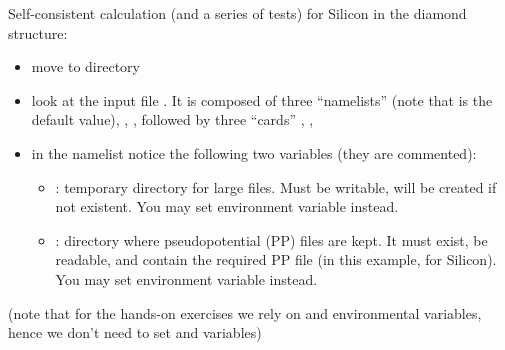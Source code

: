 \documentclass[landscape]{foils}
\begin{document}
%
Self-consistent calculation (and a series of tests) for Silicon in the
diamond structure:
\begin{itemize}
\item move to  directory
\item look at the input file . It is composed of three
``namelists''  (note that 
is the default value), , , followed 
by three ``cards'' , ,
\item in the  namelist notice the following two
  variables (they are commented):
  \begin{itemize}
  \item {}: temporary directory for large files.
    Must be writable, will be created if not existent.
    You may set environment variable  instead.\\[-0.5em]
    
  \item {}: directory where pseudopotential (PP)
    files are kept.
    It must exist, be readable, and contain the required PP file
    (in this example,  for Silicon).
    You may set environment variable 
    instead.
  \end{itemize}
\end{itemize}

(note that for the hands-on exercises we rely on
 and  environmental
variables, hence we don't need to set  and
 variables)
\end{document}
